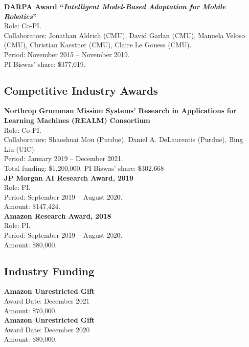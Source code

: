 \documentclass[Times]{article}
\newcommand{\funding}[1]{#1\\}
\begin{document}
\textbf{DARPA Award ``\emph{Intelligent Model-Based Adaptation for Mobile
  Robotics}''}\\
Role: Co-PI.\\
Collaborators: Jonathan Aldrich (CMU), David Garlan (CMU), Manuela Veloso
(CMU), Christian Kaestner (CMU), Claire Le Gouess (CMU).\\
Period: November 2015 -- November 2019.\\
\funding{PI Biswas' share: \$377,019.}

\vspace{-1.5em}
\subsection*{Competitive Industry Awards}

\textbf{Northrop Grumman Mission Systems’ Research in Applications for Learning Machines (REALM) Consortium}\\
Role: Co-PI.\\
Collaborators: Shaoshuai Mou (Purdue), Daniel A. DeLaurentis (Purdue), Bing Liu (UIC)\\
Period: January 2019 -- December 2021.\\
\funding{Total funding: \$1,200,000. PI Biswas' share: \$302,668}

\textbf{JP Morgan AI Research Award, 2019}\\
Role: PI.\\
Period: September 2019 -- August 2020.\\
\funding{Amount: \$147,424.}

\textbf{Amazon Research Award, 2018}\\
Role: PI.\\
Period: September 2019 -- August 2020.\\
\funding{Amount: \$80,000.}

\vspace{-1.5em}
\subsection*{Industry Funding}

\textbf{Amazon Unrestricted Gift}\\
Award Date: December 2021\\
\funding{Amount: \$70,000.}

\textbf{Amazon Unrestricted Gift}\\
Award Date: December 2020\\
\funding{Amount: \$80,000.}
\end{document}
